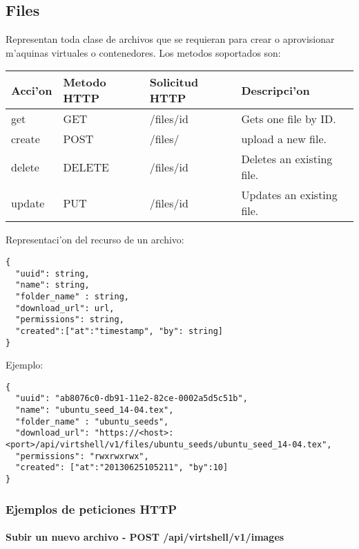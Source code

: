 \subsection{Files}
Representan toda clase de archivos que se requieran para crear o aprovisionar m'aquinas virtuales o contenedores. Los metodos soportados son:

\begin{center}
 \begin{tabular}{| l | l | l | l |}
 \hline
  \rowcolor{blueapi}
  \textbf{Acci'on} & \textbf{Metodo HTTP} & \textbf{Solicitud HTTP} & \textbf{Descripci'on} \\ [0.5ex] 
  \hline\hline
  get & GET & /files/id & Gets one file by ID. \\
  \hline
  create & POST & /files/ & upload a new file. \\
  \hline
  delete & DELETE & /files/id & Deletes an existing file. \\
  \hline  
  update & PUT & /files/id & Updates an existing file. \\ [1ex]  
  \hline
\end{tabular}
\end{center}

\vspace{1cm}
Representaci'on del recurso de un archivo:
\vspace{1cm}

\begin{lstlisting}[style=json]
{
  "uuid": string,
  "name": string,
  "folder_name" : string,
  "download_url": url,
  "permissions": string,
  "created":["at":"timestamp", "by": string]
}
\end{lstlisting}

Ejemplo:

\medskip
\begin{lstlisting}[style=json]
{
  "uuid": "ab8076c0-db91-11e2-82ce-0002a5d5c51b",
  "name": "ubuntu_seed_14-04.tex",
  "folder_name" : "ubuntu_seeds",
  "download_url": "https://<host>:<port>/api/virtshell/v1/files/ubuntu_seeds/ubuntu_seed_14-04.tex",
  "permissions": "rwxrwxrwx",
  "created": ["at":"20130625105211", "by":10]
}
\end{lstlisting}

\subsubsection{Ejemplos de peticiones HTTP}

\paragraph{Subir un nuevo archivo - POST /api/virtshell/v1/images} ~\\

